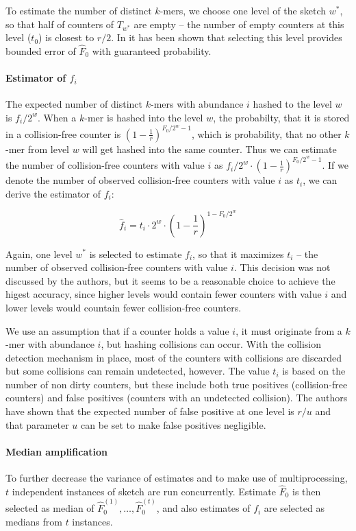 To estimate the number of distinct $k$-mers, we choose one level of the sketch $w^*$, so that half of counters of $T_{w^*}$ are empty
-- the number of empty counters at this level ($t_0$) is closest to $r/2$. In \cite{Melsted2014} it has been shown that selecting this level
provides bounded error of $\hat F_0$ with guaranteed probability.

\paragraph{Estimator of $f_i$}
The expected number of distinct $k$-mers with abundance $i$ hashed to the level $w$ is $f_i / 2^w$.
When a $k$-mer is hashed into the level $w$, the probabilty, that it is stored in a collision-free counter
is $(1 - \frac{1}{r})^{F_0/2^w - 1}$, which is probability, that no other $k$-mer from level $w$ will get hashed into the same counter.
Thus we can estimate the number of collision-free counters with value $i$ as  $f_i / 2^w \cdot (1 - \frac{1}{r})^{F_0/2^w - 1}$.
If we denote the number of observed collision-free counters with value $i$ as $t_i$, we can derive the estimator of $f_i$:

$$ \hat f_i = t_i \cdot 2^w \cdot \left(1 - \frac{1}{r}\right)^{1 - F_0/2^w} $$

Again, one level $w^*$ is selected to estimate $f_i$, so that it maximizes $t_i$ -- the number of observed collision-free counters with value $i$.
This decision was not discussed by the authors, but it seems to be a reasonable choice to achieve the higest accuracy, since higher levels
would contain fewer counters with value $i$ and lower levels would countain fewer collision-free counters.

We use an assumption that if a counter holds a value $i$, it must originate from a $k$-mer with abundance $i$, 
but hashing collisions can occur. With the collision detection mechanism in place, most of the counters with collisions are discarded but
some collisions can remain undetected, however. The value $t_i$ is based on the number of non dirty counters, 
but these include both true positives (collision-free counters) and false positives (counters with an undetected collision).
The authors have shown that the expected number of false positive at one level is $r/u$ \cite{Sivadasan2016} and that 
parameter $u$ can be set to make false positives negligible.

\paragraph{Median amplification}
To further decrease the variance of estimates and to make use of multiprocessing, $t$ independent instances of sketch are run concurrently.
Estimate $\hat F_0$ is then selected as median of $\hat F_0^{(1)}, \dots, \hat F_0^{(t)}$, and also estimates of $f_i$ are
selected as medians from $t$ instances. 

